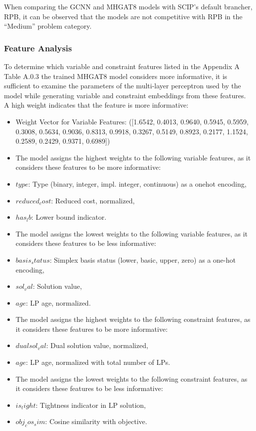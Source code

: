When comparing the GCNN and MHGAT8 models with SCIP’s default brancher, RPB, it can be observed that the models are not competitive with RPB in the “Medium” problem category.




\subsubsection{Feature Analysis}
To determine which variable and constraint features listed in the Appendix A Table A.0.3 %
the trained MHGAT8 model considers more informative, it is sufficient to examine the parameters of the multi-layer perceptron used by the model while generating variable and constraint embeddings from these features.
A high weight indicates that the feature is more informative:


\begin{itemize}
  \item Weight Vector for Variable Features: ([1.6542, 0.4013, 0.9640, 0.5945, 0.5959, 0.3008, 0.5634, 0.9036, 0.8313, 0.9918, 0.3267, 0.5149, 0.8923, 0.2177, 1.1524, 0.2589, 0.2429, 0.9371, 0.6989])
  \item The model assigns the highest weights to the following variable features, as it considers these features to be more informative:
    \item $type$: Type (binary, integer, impl. integer, continuous) as a onehot encoding,
    \item $reduced_cost$: Reduced cost, normalized,
    \item $has_lb$: Lower bound indicator.
  \item The model assigns the lowest weights to the following variable features, as it considers these features to be less informative:
    \item $basis_status$: Simplex basis status (lower, basic, upper, zero) as a one-hot encoding,
    \item $sol_val$: Solution value,
    \item $age$: LP age, normalized.
  \item The model assigns the highest weights to the following constraint features, as it considers these features to be more informative:
    \item $dualsol_val$: Dual solution value, normalized,
    \item $age$: LP age, normalized with total number of LPs.
  \item The model assigns the lowest weights to the following constraint features, as it considers these features to be less informative:
    \item $is_tight$: Tightness indicator in LP solution,
    \item $obj_cos_sim$: Cosine similarity with objective.
\end{itemize}